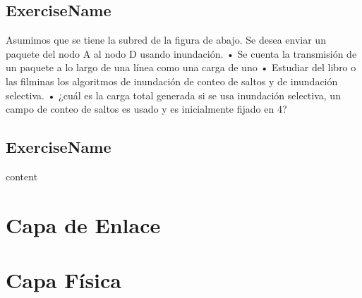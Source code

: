 \documentclass[12pt]{report}
\begin{document}
\begin{exer}
\section{ExerciseName \sone}
Asumimos que se tiene la subred de la figura de abajo. Se desea enviar un paquete del
nodo A al nodo D usando inundación.
• Se cuenta la transmisión de un paquete a lo largo de una línea como una carga de uno
• Estudiar del libro o las filminas los algoritmos de inundación de conteo de saltos y de
inundación selectiva.
• ¿cuál es la carga total generada si se usa inundación selectiva, un campo de conteo de saltos
es usado y es inicialmente fijado en 4?


\end{exer}




\begin{exer}
\section{ExerciseName \sone}
content
\end{exer}





%
%


\chapter{Capa de Enlace}

%
%


\chapter{Capa Física}
\end{document}
